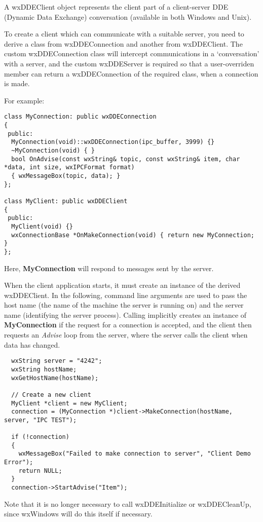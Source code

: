 A wxDDEClient object represents the client part of a client-server DDE
(Dynamic Data Exchange) conversation (available in both
Windows and Unix).

To create a client which can communicate with a suitable server,
you need to derive a class from wxDDEConnection and another from wxDDEClient.
The custom wxDDEConnection class will intercept communications in
a `conversation' with a server, and the custom wxDDEServer is required
so that a user-overriden  member can return
a wxDDEConnection of the required class, when a connection is made.

For example:

\begin{verbatim}
class MyConnection: public wxDDEConnection
{
 public:
  MyConnection(void)::wxDDEConnection(ipc_buffer, 3999) {}
  ~MyConnection(void) { }
  bool OnAdvise(const wxString& topic, const wxString& item, char *data, int size, wxIPCFormat format)
  { wxMessageBox(topic, data); }
};

class MyClient: public wxDDEClient
{
 public:
  MyClient(void) {}
  wxConnectionBase *OnMakeConnection(void) { return new MyConnection; }
};

\end{verbatim}

Here, {\bf MyConnection} will respond to  messages sent
by the server.

When the client application starts, it must create an instance of the derived wxDDEClient. In the following, command line
arguments are used to pass the host name (the name of the machine the server is running
on) and the server name (identifying the server process). Calling \rtfsp
implicitly creates an instance of {\bf MyConnection} if the request for a
connection is accepted, and the client then requests an {\it Advise} loop
from the server, where the server calls the client when data has changed.

\begin{verbatim}
  wxString server = "4242";
  wxString hostName;
  wxGetHostName(hostName);

  // Create a new client
  MyClient *client = new MyClient;
  connection = (MyConnection *)client->MakeConnection(hostName, server, "IPC TEST");

  if (!connection)
  {
    wxMessageBox("Failed to make connection to server", "Client Demo Error");
    return NULL;
  }
  connection->StartAdvise("Item");
\end{verbatim}

Note that it is no longer necessary to call wxDDEInitialize or wxDDECleanUp, since
wxWindows will do this itself if necessary.

